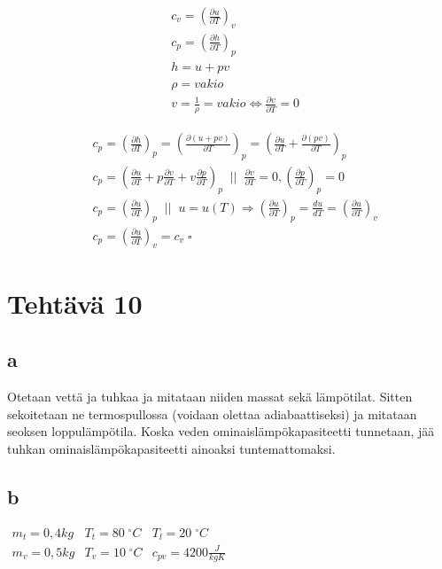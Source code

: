 \documentclass[12pt,a4paper,finnish]{article}
\begin{document}
\begin{align}
 &c_v = \left(\frac{\partial u}{\partial T}\right)_v\\
 &c_p = \left(\frac{\partial h}{\partial T}\right)_p\\
 &h = u + pv\\
 &\rho = vakio\\
 &v = \frac{1}{\rho} = vakio \Leftrightarrow \frac{\partial v}{\partial T} = 0
\end{align}

\begin{align}
 &c_p = \left(\frac{\partial h}{\partial T}\right)_p 
  = \left(\frac{\partial (u + pv)}{\partial T}\right)_p
   = \left(\frac{\partial u}{\partial T} + \frac{\partial (pv)}{\partial T}\right)_p\\
 &c_p
  = \left(\frac{\partial u}{\partial T} + p\frac{\partial v}{\partial T} 
    + v\frac{\partial p}{\partial T}\right)_p \;\;\bigg|\bigg|\;\; 
  \frac{\partial v}{\partial T} = 0, \left(\frac{\partial p}{\partial T}\right)_p = 0\\
 &c_p = \left(\frac{\partial u}{\partial T}\right)_p \;\;\bigg|\bigg|\;\; 
  u = u(T) \Rightarrow \left(\frac{\partial u}{\partial T}\right)_p 
     = \frac{du}{dT} = \left(\frac{\partial u}{\partial T}\right)_v\\
 &c_p = \left(\frac{\partial u}{\partial T}\right)_v = c_v \; \square
\end{align}

\section{Tehtävä 10}

\subsection{a}

Otetaan vettä ja tuhkaa ja mitataan niiden massat sekä lämpötilat. Sitten sekoitetaan ne termospullossa 
(voidaan olettaa adiabaattiseksi) ja mitataan seoksen loppulämpötila. Koska veden 
ominaislämpökapasiteetti tunnetaan, jää tuhkan ominaislämpökapasiteetti ainoaksi tuntemattomaksi.

\subsection{b}

\begin{math}
\begin{array}{lll}
  m_t = 0,4 kg & T_t = 80\;^{\circ}C & T_l = 20\;^{\circ}C\\
  m_v = 0,5 kg & T_v = 10\;^{\circ}C & c_{pv} = 4200 \frac{J}{kgK}\\
\end{array}
\end{math}
\end{document}
